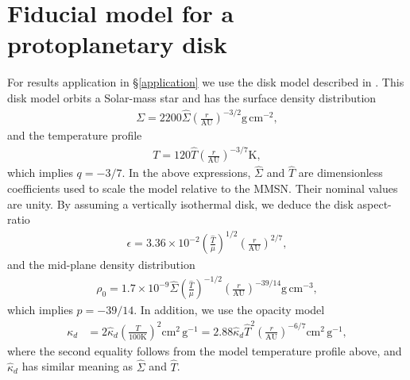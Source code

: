 

\section{Fiducial model for a protoplanetary disk}\label{mmsn}
For results application in \S\ref{application} we use the disk model
described in \cite{chiang10}. This disk model orbits a Solar-mass star and 
has the surface density distribution
\begin{align}\label{mmsn_sigma}
  \Sigma = 2200
  \hat{\Sigma}\left(\frac{r}{\mathrm{AU}}\right)^{-3/2}\mathrm{g}\,\mathrm{cm}^{-2},  
\end{align}
and the temperature profile
\begin{align}\label{mmsn_temp}
  T = 120\hat{T}\left(\frac{r}{\mathrm{AU}}\right)^{-3/7} \mathrm{K},
\end{align}
which implies $q=-3/7$. In the above expressions, $\hat{\Sigma}$ and
$\hat{T}$ are dimensionless coefficients used to scale the model
relative to the MMSN. Their nominal values are unity. By assuming a
vertically isothermal disk, we deduce the disk aspect-ratio 
\begin{align}\label{mmsn_epsilon}
  \epsilon =
  3.36\times10^{-2}\left(\frac{\hat{T}}{\mu}\right)^{1/2}\left(\frac{r}{\mathrm{AU}}\right)^{2/7}, 
\end{align}
and the mid-plane density distribution 
\begin{align}
\rho_0 = 1.7\times10^{-9}
  \hat{\Sigma}\left(\frac{\hat{T}}{\mu}\right)^{-1/2}\left(\frac{r}{\mathrm{AU}}\right)^{-39/14}\mathrm{g}\,\mathrm{cm}^{-3},
\end{align}
which implies $p=-39/14$. 
In addition, we use the opacity model
 \begin{align}
   \kappa_d &= 2 \hat{\kappa}_d \left(\frac{T}{100\mathrm{K}}\right)^2
   \mathrm{cm}^2\,\mathrm{g}^{-1}
    =
   2.88\hat{\kappa}_d\hat{T}^2\left(\frac{r}{\mathrm{AU}}\right)^{-6/7}\mathrm{cm}^2\,\mathrm{g}^{-1},   
 \end{align}
\citep{bell94} where the second equality follows from the model
temperature profile above, and $\hat{\kappa}_d$ has similar meaning as
$\hat{\Sigma}$ and $\hat{T}$.  
